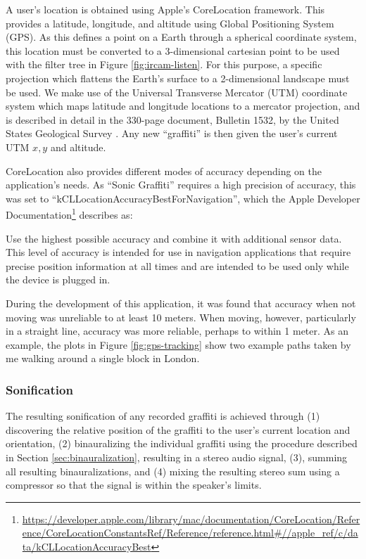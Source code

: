 \documentclass[a4paper,10pt,final]{ThesisStyle}
\begin{document}
A user's location is obtained using Apple's CoreLocation framework.  This provides a latitude, longitude, and altitude using Global Positioning System (GPS).  As this defines a point on a Earth through a spherical coordinate system, this location must be converted to a 3-dimensional cartesian point to be used with the filter tree in Figure \ref{fig:ircam-listen}.  For this purpose, a specific projection which flattens the Earth's surface to a 2-dimensional landscape must be used.  We make use of the Universal Transverse Mercator (UTM) coordinate system which maps latitude and longitude locations to a mercator projection, and is described in detail in the 330-page document, Bulletin 1532, by the United States Geological Survey \cite{}.  Any new ``graffiti'' is then given the user's current UTM $x,y$ and altitude.  

CoreLocation also provides different modes of accuracy depending on the application's needs.  As ``Sonic Graffiti'' requires a high precision of accuracy, this was set to ``kCLLocationAccuracyBestForNavigation'', which the Apple Developer Documentation\footnote{\url{https://developer.apple.com/library/mac/documentation/CoreLocation/Reference/CoreLocationConstantsRef/Reference/reference.html#//apple\_ref/c/data/kCLLocationAccuracyBest}} describes as:
\begin{quotationb}
Use the highest possible accuracy and combine it with additional sensor data. This level of accuracy is intended for use in navigation applications that require precise position information at all times and are intended to be used only while the device is plugged in.
\end{quotationb}
During the development of this application, it was found that accuracy when not moving was unreliable to at least 10 meters.  When moving, however, particularly in a straight line, accuracy was more reliable, perhaps to within 1 meter.  As an example, the plots in Figure \ref{fig:gps-tracking} show two example paths taken by me walking around a single block in London.  

\subsubsection{Sonification}

The resulting sonification of any recorded graffiti is achieved through (1) discovering the relative position of the graffiti to the user's current location and orientation, (2) binauralizing the individual graffiti using the procedure described in Section \ref{sec:binauralization}, resulting in a stereo audio signal, (3), summing all resulting binauralizations, and (4) mixing the resulting stereo sum using a compressor so that the signal is within the speaker's limits.   
\end{document}
